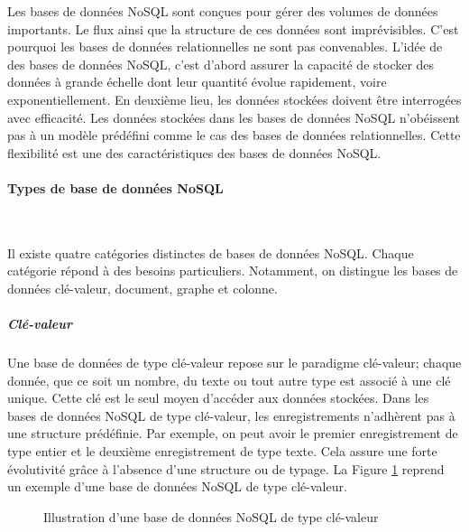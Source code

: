	
	Les bases de données NoSQL sont conçues pour gérer des  volumes de données importants. Le flux ainsi que la structure de  ces données sont imprévisibles. C'est pourquoi les bases de données relationnelles ne sont pas convenables. L'idée  de des bases de données NoSQL, c'est d'abord assurer la capacité de stocker des données à grande échelle dont leur  quantité  évolue rapidement, voire exponentiellement.  En deuxième lieu, les données stockées  doivent être interrogées  avec efficacité. Les données stockées dans  les bases de données NoSQL n'obéissent pas à un modèle prédéfini comme le cas des bases de données relationnelles. Cette flexibilité est une des caractéristiques des bases de données NoSQL.
	
	
	\paragraph{Types de base de données NoSQL} \label{sec:nosql-database}  ~
	
	Il existe quatre catégories distinctes de bases de données NoSQL. Chaque catégorie répond  à des besoins particuliers. Notamment, on distingue les bases de données clé-valeur, document, graphe et colonne.
	
	
	\subparagraph {Clé-valeur} Une base de données de type clé-valeur repose sur le paradigme clé-valeur; chaque donnée, que ce soit un nombre, du texte ou tout autre type est associé à une clé unique. Cette clé est le seul moyen d'accéder aux données stockées.
	Dans les bases de données NoSQL de type clé-valeur, les enregistrements  n'adhèrent pas à une structure prédéfinie. Par exemple, on peut avoir le premier enregistrement de type entier et le deuxième enregistrement de type texte. Cela assure une forte évolutivité grâce à l'absence d'une structure ou de typage. La Figure \ref{fig:key-value-nosql} reprend un exemple d'une base de données NoSQL de type clé-valeur.

	
	\begin{figure}[H]
		\captionsetup{justification=centering}
		\centering
		\resizebox{.4\textwidth}{!}{
			
	    }
		\caption{Illustration d'une base de données NoSQL de type clé-valeur}
		\label{fig:key-value-nosql}
	\end{figure}
	

